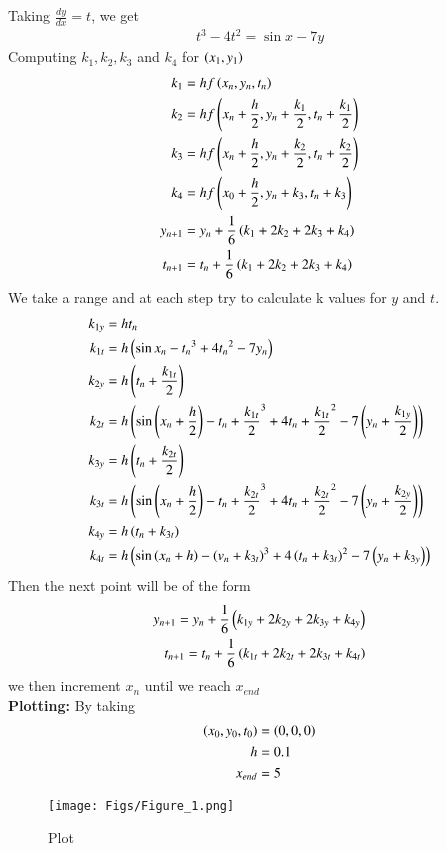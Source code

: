 \documentclass[journal]{IEEEtran}
\begin{document}
Taking $\frac{dy}{dx}=t$, we get
\begin{align}
t^3-4t^2=\sin x-7y
\end{align}
Computing $k_1,k_2,k_3$ and $k_4$ for $\left(x_1,y_1\right)$
\begin{align}
k_1&=hf\left(x_n,y_n,t_n\right)\\
k_2&=hf\left(x_n+\frac{h}{2},y_n+\frac{k_1}{2},t_n+\frac{k_1}{2}\right)\\
k_3&=hf\left(x_n+\frac{h}{2},y_n+\frac{k_2}{2},t_n+\frac{k_2}{2}\right)\\
k_4&=hf\left(x_0+\frac{h}{2},y_n+k_3,t_n+k_3\right)\\
y_{n+1}&=y_n+\frac{1}{6}\left(k_1+2k_2+2k_3+k_4\right)\\
t_{n+1}&=t_n+\frac{1}{6}\left(k_1+2k_2+2k_3+k_4\right)
\end{align}
We take a range  and at each step try to calculate k values for $y$ and $t$.
\begin{align}
k_{1y}&= ht_n\\
k_{1t}&=h\left(\sin x_n-{t_n}^3+4{t_n}^2-7y_n\right)\\
k_{2y}&= h\left(t_n+\frac{k_{1t}}{2}\right)\\
k_{2t}&=h\left(\sin \left(x_n+\frac{h}{2}\right)-{t_n+\frac{k_{1t}}{2}}^3+4{t_n+\frac{k_{1t}}{2}}^2-7\left(y_n+\frac{k_{1y}}{2}\right)\right)\\
k_{3y}&= h\left(t_n+\frac{k_{2t}}{2}\right)\\
k_{3t}&=h\left(\sin \left(x_n+\frac{h}{2}\right)-{t_n+\frac{k_{2t}}{2}}^3+4{t_n+\frac{k_{2t}}{2}}^2-7\left(y_n+\frac{k_{2y}}{2}\right)\right)\\
k_{4y}&=h\left(t_n+k_{3t}\right)\\
k_{4t}&=h\left(\sin\left(x_n+h\right)-\left(v_n+k_{3t}\right)^3+4\left(t_n+k_{3t}\right)^2-7\left(y_n+k_{3y}\right)\right)
\end{align}
Then the next point will be of the form 
\begin{align}
y_{n+1}=y_n+\frac{1}{6}\left(k_{1y}+2k_{2y}+2k_{3y}+k_{4y}\right)\\
t_{n+1}=t_n+\frac{1}{6}\left(k_{1t}+2k_{2t}+2k_{3t}+k_{4t}\right)
\end{align}
we then increment $x_n$ until we reach $x_{end}$\\
\textbf{Plotting:}
By taking 
\begin{align}
\left(x_0,y_0,t_0\right)&=\left(0,0,0\right)\\
h&=0.1\\
x_{end}&=5
\end{align}
\begin{figure}[h!]
   \centering
   \texttt{[image: Figs/Figure\_1.png]}
   \caption{Plot}
\end{figure}
\end{document}
